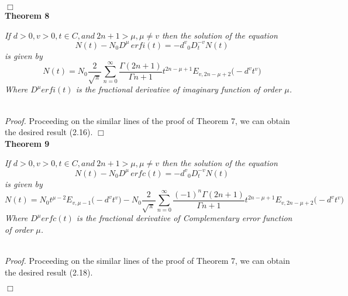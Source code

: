 \documentclass[leqno]{article}
\begin{document}
\hfill$\Box$
\medskip
\noindent\\
{\bf Theorem 8}
{\it 
If $d > 0, v > 0, t \in C, and\ {2n+1} > \mu , \mu \neq {v} $ then the solution of the equation
\begin{equation}
    N(t) - {{N_0}D^{\mu}} \, erfi(t) = {-d^v}{_0D_t^{-v}}N(t)
\end{equation}  
is given by
\begin{equation}
    N(t)=N_0
    {\frac{2}{\sqrt{\pi}}}
    \sum_{n = 0}^{\infty}
    \frac{\Gamma{(2n+1)}}{\Gamma{n+1}}
    t^{2n-{\mu}+1}
    E_{v, 2n-{\mu}+2}
    \big(-{d^v}{t^v})
\end{equation}
Where $D^{\mu}erfi(t)$ is the fractional derivative of imaginary function of order $\mu$.

}
\vspace{0.05in}\\
%
{\it Proof.}
Proceeding on the similar lines of the proof of Theorem 7, we can obtain the desired result (2.16).
\hfill$\Box$
\medskip
\noindent\\
{\bf Theorem 9}
{\it 
If $d > 0, v > 0, t \in C, and\ {2n+1} > \mu , \mu \neq {v} $ then the solution of the equation
\begin{equation}
    N(t) - {{N_0}D^{\mu}} \, erfc(t) = {-d^v}{_0D_t^{-v}}N(t)
\end{equation}
is given by
\begin{equation}
    N(t)
    =N_0
    t^{{\mu}-2}
    E_{v, {\mu} - 1}
    {\big(-{{d^v}}{t^v}\big)}
    -N_0{\frac{2}{\sqrt{\pi}}}
    \sum_{n = 0}^{\infty}
    \frac{(-1)^n\Gamma{(2n+1)}}{\Gamma{n+1}}
    t^{2n-{\mu}+1}
    E_{v, 2n-{\mu}+2}
    \big(-{d^v}{t^v})
\end{equation}
Where $D^{\mu}erfc(t)$ is the fractional derivative of Complementary error function of order $\mu$.

}
\vspace{0.05in}\\
%
\noindent
{\it Proof.}
Proceeding on the similar lines of the proof of Theorem 7, we can obtain the desired result (2.18).

\hfill$\Box$
\medskip
\end{document}
